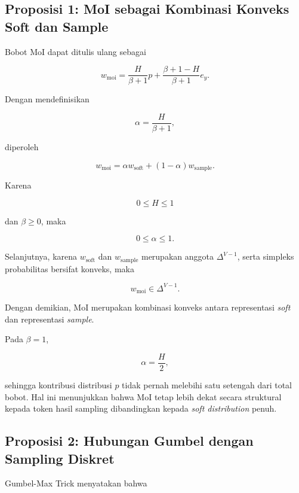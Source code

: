 \subsection{Proposisi 1: MoI sebagai Kombinasi Konveks Soft dan Sample}

Bobot MoI dapat ditulis ulang sebagai

\begin{equation}
w_{\mathrm{moi}}
=
\frac{H}{\beta+1}p
+
\frac{\beta+1-H}{\beta+1}e_y.
\end{equation}

Dengan mendefinisikan

\begin{equation}
\alpha=\frac{H}{\beta+1},
\end{equation}

diperoleh

\begin{equation}
w_{\mathrm{moi}}
=
\alpha w_{\mathrm{soft}}
+
(1-\alpha)w_{\mathrm{sample}}.
\end{equation}

Karena

\[
0\leq H\leq1
\]

dan \(\beta\geq0\), maka

\[
0\leq\alpha\leq1.
\]

Selanjutnya, karena \(w_{\mathrm{soft}}\) dan \(w_{\mathrm{sample}}\) merupakan anggota \(\Delta^{V-1}\), serta simpleks probabilitas bersifat konveks, maka

\[
w_{\mathrm{moi}}\in\Delta^{V-1}.
\]

Dengan demikian, MoI merupakan kombinasi konveks antara representasi \textit{soft} dan representasi \textit{sample}.

Pada \(\beta=1\),

\begin{equation}
\alpha=\frac{H}{2},
\end{equation}

sehingga kontribusi distribusi \(p\) tidak pernah melebihi satu setengah dari total bobot. Hal ini menunjukkan bahwa MoI tetap lebih dekat secara struktural kepada token hasil sampling dibandingkan kepada \textit{soft distribution} penuh.

\subsection{Proposisi 2: Hubungan Gumbel dengan Sampling Diskret}

Gumbel-Max Trick menyatakan bahwa

